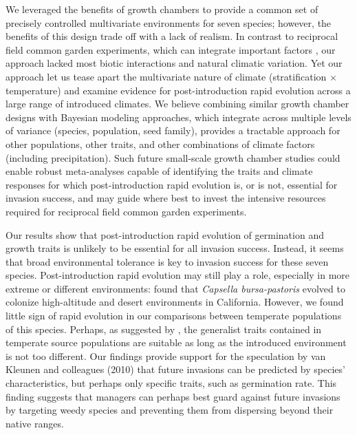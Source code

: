 \documentclass[12pt]{article}\usepackage[]{graphicx}\usepackage[]{color}
\begin{document}
	We leveraged the benefits of growth chambers to provide a common set of precisely controlled multivariate environments for seven species; however, the benefits of this design trade off with a lack of realism. In contrast to reciprocal field common garden experiments, which can integrate important factors \parencite{Germain2018,Blois2013}, our approach lacked most biotic interactions and natural climatic variation. Yet our approach let us tease apart the multivariate nature of climate (stratification $\times$ temperature) and examine evidence for post-introduction rapid evolution across a large range of introduced climates. We believe combining similar growth chamber designs with Bayesian modeling approaches, which integrate across multiple levels of variance (species, population, seed family), provides a tractable approach for other populations, other traits, and other combinations of climate factors (including precipitation). Such future small-scale growth chamber studies could enable robust meta-analyses capable of identifying the traits and climate responses for which post-introduction rapid evolution is, or is not, essential for invasion success, and may guide where best to invest the intensive resources required for reciprocal field common garden experiments. %
	
	Our results show that post-introduction rapid evolution of germination and growth traits is unlikely to be essential for all invasion success. Instead, it seems that broad environmental tolerance is key to invasion success for these seven species. Post-introduction rapid evolution may still play a role, especially in more extreme or different environments:  \textcite{Linde2001} found that \textit{Capsella bursa-pastoris} evolved to colonize high-altitude and desert environments in California. However, we found little sign of rapid evolution in our comparisons between temperate populations of this species. Perhaps, as suggested by \textcite{Baker1965}, the generalist traits contained in temperate source populations are suitable as long as the introduced environment is not too different. Our findings provide support for  the speculation by van Kleunen and colleagues (2010) that future invasions can be predicted by species' characteristics, but perhaps only specific traits, such as germination rate. This finding suggests that managers can perhaps best guard against future invasions by targeting weedy species and preventing them from dispersing beyond their native ranges. 
	
\end{document}
